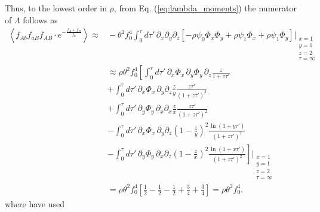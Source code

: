 \documentclass[aps,rmp,twocolumn,groupedaddress,floatfix,notitlepage]{revtex4-1}
\begin{document}
Thus, to the lowest order in $\rho$, from Eq. (\ref{eq:lambda_moments}) the numerator of $\Lambda$ follows as
\begin{align}\label{eq:lambda_num_contribution}
    \left\langle f_{Ab}f_{aB}f_{AB}\cdot e^{-\frac{f_{A}+f_{B}}{f_0}}\right\rangle \approx&{} 
    -\theta^2 f_0^4 \int_0^{\tau} d\tau'\, \partial_x\partial_y\partial_z \left[-\rho \psi_0\Phi_x\Phi_y + \rho \psi_1\Phi_x + \rho \psi_1\Phi_y\right]\Bigg\vert_{\substack{x=1 \\ y=1 \\ z=2 \\ \tau=\infty}} \\ \nonumber
    &\approx \rho \theta^2 f_0^4 \left[
    \int_0^{\tau} d\tau'\, \partial_x \Phi_x \, \partial_y \Phi_y \, \partial_z \frac{z}{1+z\tau'} \right. \\\nonumber
    &+ \left. \int_0^{\tau} d\tau'\, \partial_x \Phi_x \, \partial_y \partial_z \frac{z}{y} \frac{z\tau'}{(1+z\tau')^2} \right. \\\nonumber
    &+ \left. \int_0^{\tau} d\tau'\, \partial_y \Phi_y \, \partial_x \partial_x \frac{z}{x} \frac{z\tau'}{(1+z\tau')^2} \right. \\\nonumber
    &- \left. \int_0^{\tau} d\tau'\, \partial_x \Phi_x \, \partial_y \partial_z \left(1-\frac{z}{y}\right)^2 \frac{\ln(1+y\tau')}{(1+z\tau')^2} \right. \\\nonumber
    &- \left. \int_0^{\tau} d\tau'\, \partial_y \Phi_y \, \partial_x \partial_z \left(1-\frac{z}{x}\right)^2 \frac{\ln(1+x\tau')}{(1+z\tau')^2} 
    \right]\Bigg\vert_{\substack{x=1 \\ y=1 \\ z=2 \\ \tau=\infty}} \\ \nonumber
    &= \rho \theta^2 f_0^4 \left[\frac{1}{2} -\frac{1}{2} -\frac{1}{2} +\frac{3}{4} +\frac{3}{4}\right] = \rho \theta^2 f_0^4.
\end{align}
where have used 
\end{document}
